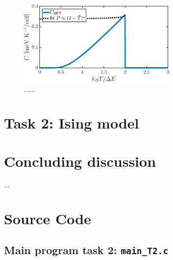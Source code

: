 \begin{figure}[!ht]
\begin{center}
  \includegraphics[width=0.7\textwidth]{../figures/C_MFT} 
  \caption{......}
  \label{fig1}
\end{center}
\end{figure}

\section*{Task 2: Ising model}


\section*{Concluding discussion}
 ...  
\newpage

\appendix

\section{Source Code}

%

%

\subsection{Main program task 2: \texttt{main\_T2.c}}



